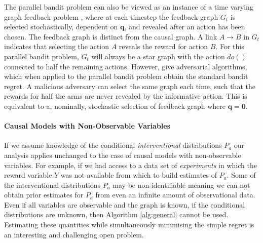 
The parallel bandit problem can also be viewed as an instance of a time varying graph feedback problem \citep{Alon2015,Kocak2014}, where at each timestep the feedback graph $G_t$ is selected stochastically, dependent on $\boldsymbol{q}$, and revealed after an action has been chosen. The feedback graph is distinct from the causal graph. A link $A \rightarrow B$ in $G_t$ indicates that selecting the action $A$ reveals the reward for action $B$. For this parallel bandit problem, $G_t$ will always be a star graph with the action $do()$ connected to half the remaining actions. However, \citet{Alon2015,Kocak2014} give adversarial algorithms, which when applied to the parallel bandit problem obtain the standard bandit regret. A malicious adversary can select the same graph each time, such that the rewards for half the arms are never revealed by the informative action. This is equivalent to a, nominally, stochastic selection of feedback graph where $\boldsymbol{q} = \boldsymbol{0}$. 



\paragraph{Causal Models with Non-Observable Variables}
If we assume knowledge of the conditional \textit{interventional} distributions $P_a$ our analysis applies unchanged to the case of causal models with 
non-observable variables. For example, if we had access to a data set of \textit{experiments} in which the reward variable $Y$ was not 
available from which to build estimates of $P_a$. Some of the interventional distributions $P_a$ may be non-identifiable meaning we can not obtain prior estimates for $P_a$ from 
even an infinite amount of observational data. Even if all variables are observable and the graph is known, if the conditional distributions are unknown, then Algorithm
\ref{alg:general} cannot be used. Estimating these quantities while simultaneously minimising the simple regret is an interesting and challenging open problem.


